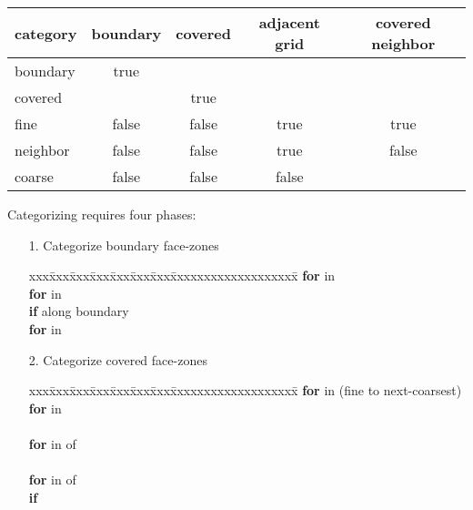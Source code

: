 \documentclass[10pt]{article}
\begin{document}
\begin{center}
\begin{tabular}{l|cccc}
category & boundary & covered & adjacent grid & covered neighbor \\ \hline
boundary & true &  \\
covered  &        & true \\
fine     & false & false & true & true \\
neighbor & false & false  & true& false \\
coarse   & false & false  & false \\
\end{tabular}
\end{center}

Categorizing requires four phases:

\begin{itemize}
\item[1.] Categorize boundary face-zones
\begin{tabbing}
xxx\=xxx\=xxx\=xxx\=xxx\=xxx\=xxx\=xxxxxxxxxxxxxxxxxxx\=\kill
\> \textbf{for}  in  \\
\>\> \textbf{for}  in  \\
\>\>\> \textbf{if}  along boundary \\
\>\>\>\> \textbf{for}  in  \\
\>\>\>\>\> 
\end{tabbing}
\item[2.] Categorize covered face-zones
\begin{tabbing}
xxx\=xxx\=xxx\=xxx\=xxx\=xxx\=xxx\=xxxxxxxxxxxxxxxxxxx\=\kill
\> \textbf{for}  in  (fine to next-coarsest) \\
\>\> \textbf{for}  in  \\
\>\>\>  \\
\>\>\>\> \textbf{for}  in  of \\
\>\>\>\>\>      \\
\>\>\>\> \textbf{for}  in  of \\
\>\>\>\>\>     \textbf{if}  \\
\>\>\>\>\>\> 
\end{tabbing}

\end{itemize}
\end{document}
